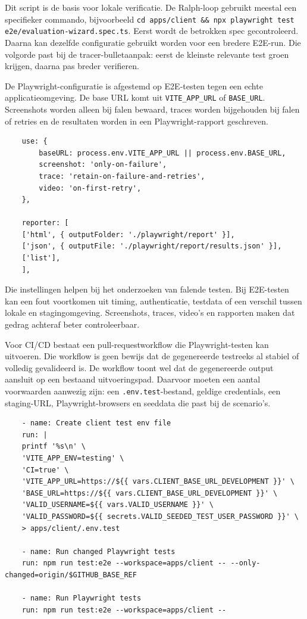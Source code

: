 Dit script is de basis voor lokale verificatie. De Ralph-loop gebruikt meestal een specifieker commando, bijvoorbeeld \texttt{cd apps/client \&\& npx playwright test e2e/evaluation-wizard.spec.ts}. Eerst wordt de betrokken spec gecontroleerd. Daarna kan dezelfde configuratie gebruikt worden voor een bredere E2E-run. Die volgorde past bij de tracer-bulletaanpak: eerst de kleinste relevante test groen krijgen, daarna pas breder verifieren.

De Playwright-configuratie is afgestemd op E2E-testen tegen een echte applicatieomgeving. De base URL komt uit \texttt{VITE\_APP\_URL} of \texttt{BASE\_URL}. Screenshots worden alleen bij falen bewaard, traces worden bijgehouden bij falen of retries en de resultaten worden in een Playwright-rapport geschreven.

\begin{verbatim}
    use: {
        baseURL: process.env.VITE_APP_URL || process.env.BASE_URL,
        screenshot: 'only-on-failure',
        trace: 'retain-on-failure-and-retries',
        video: 'on-first-retry',
    },
    
    reporter: [
    ['html', { outputFolder: './playwright/report' }],
    ['json', { outputFile: './playwright/report/results.json' }],
    ['list'],
    ],
\end{verbatim}

Die instellingen helpen bij het onderzoeken van falende testen. Bij E2E-testen kan een fout voortkomen uit timing, authenticatie, testdata of een verschil tussen lokale en stagingomgeving. Screenshots, traces, video's en rapporten maken dat gedrag achteraf beter controleerbaar.

Voor CI/CD bestaat een pull-requestworkflow die Playwright-testen kan uitvoeren. Die workflow is geen bewijs dat de gegenereerde testreeks al stabiel of volledig gevalideerd is. De workflow toont wel dat de gegenereerde output aansluit op een bestaand uitvoeringspad. Daarvoor moeten een aantal voorwaarden aanwezig zijn: een \texttt{.env.test}-bestand, geldige credentials, een staging-URL, Playwright-browsers en seeddata die past bij de scenario's.

\begin{verbatim}
    - name: Create client test env file
    run: |
    printf '%s\n' \
    'VITE_APP_ENV=testing' \
    'CI=true' \
    'VITE_APP_URL=https://${{ vars.CLIENT_BASE_URL_DEVELOPMENT }}' \
    'BASE_URL=https://${{ vars.CLIENT_BASE_URL_DEVELOPMENT }}' \
    'VALID_USERNAME=${{ vars.VALID_USERNAME }}' \
    'VALID_PASSWORD=${{ secrets.VALID_SEEDED_TEST_USER_PASSWORD }}' \
    > apps/client/.env.test
    
    - name: Run changed Playwright tests
    run: npm run test:e2e --workspace=apps/client -- --only-changed=origin/$GITHUB_BASE_REF
    
    - name: Run Playwright tests
    run: npm run test:e2e --workspace=apps/client --
\end{verbatim}

